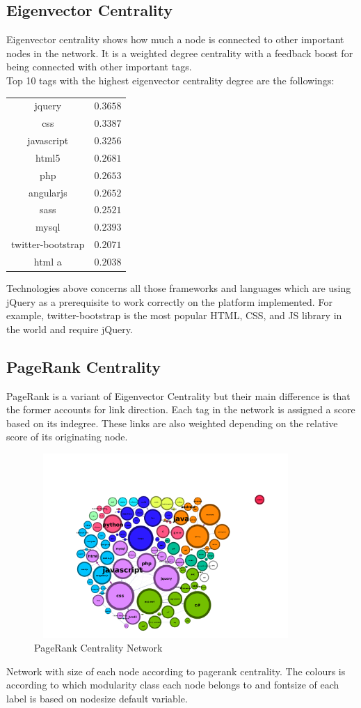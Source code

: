 \documentclass[12pt]{article}
\begin{document}
		\subsection{Eigenvector Centrality}
			Eigenvector  centrality shows how much a node is connected to other important nodes in the network. It is a weighted degree centrality with a feedback boost for being connected with other important tags.\\
			Top 10 tags with the highest eigenvector centrality degree are the followings:
			\begin{center}
				\begin{tabular}{ |c|c| } 
					\hline
					jquery & $0.3658$  \\ 
					css & $0.3387$ \\
					javascript & $0.3256$ \\
					html5 & $0.2681$ \\
					php & $0.2653$ \\
					angularjs & $0.2652$ \\
					sass& $0.2521$ \\
					mysql & $0.2393$ \\
					twitter-bootstrap & $0.2071$\\
					html a& $0.2038$\\
					\hline
				\end{tabular}
			\end{center} 
		Technologies above concerns all those frameworks and languages which are using jQuery as a prerequisite to work correctly on the platform implemented. For example, twitter-bootstrap is the most popular HTML, CSS, and JS library in the world and require jQuery. 
		\subsection{PageRank Centrality}
			PageRank is a variant of Eigenvector Centrality but their main difference is that  the former accounts for link direction. Each tag in the network is assigned a score based on its indegree. These links are also weighted depending on the relative score of its originating node. 
			       \begin{figure}[ht]
						\centering
						\includegraphics[width=10cm,height=7cm]{pagerank}
						\caption{PageRank Centrality Network}
				\end{figure}
			\FloatBarrier
			Network with size of each node according to pagerank centrality. The colours is according to which modularity class each node belongs to and fontsize of each label is based on nodesize default variable.
			
\end{document}
